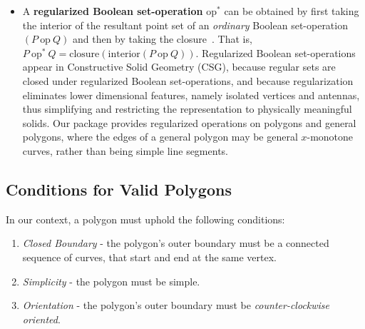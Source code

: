 \begin{itemize}
\item A \textbf{regularized Boolean set-operation} $\mbox{op}^*$ can be obtained by
first taking the interior of the resultant point set of an {\em ordinary}
Boolean set-operation $(P\ \mbox{op}\ Q)$ and then by taking the
closure~\cite{cgal:h-sm-04}. That is,
$P\ \mbox{op}^*\ Q = \mbox{closure}(\mbox{interior} (P\ \mbox{op}\ Q))$.
Regularized Boolean set-operations appear in Constructive Solid
Geometry (CSG), because regular sets are closed under regularized
Boolean set-operations, and because regularization eliminates lower
dimensional features, namely isolated vertices and antennas, thus
simplifying and restricting the representation to physically meaningful
solids. Our package provides regularized operations on polygons and
general polygons, where the edges of a general polygon may be
general $x$-monotone curves, rather than being simple line segments.
\end{itemize}
\subsection{Conditions for Valid Polygons\label{bso_ssec:polygon_validation}}

In our context, a polygon must uphold the following conditions:\\
\begin{enumerate}
 \item\textit{Closed Boundary} - the polygon's outer boundary must be a connected sequence of curves, that start and end at the same vertex.
\item \textit{Simplicity} - the polygon must be simple.
\item \textit{Orientation} - the polygon's outer boundary must be \textit{counter-clockwise oriented}.
\end{enumerate}
 

